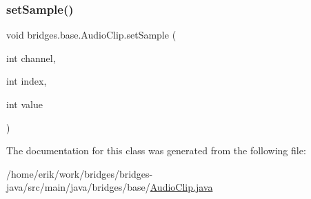 \mbox{\label{classbridges_1_1base_1_1_audio_clip_ae773ae030f39011060ae6088f19812f9}} 
\subsubsection{\texorpdfstring{set\+Sample()}{setSample()}}
{\footnotesize\ttfamily void bridges.\+base.\+Audio\+Clip.\+set\+Sample (\begin{DoxyParamCaption}\item[{int}]{channel,  }\item[{int}]{index,  }\item[{int}]{value }\end{DoxyParamCaption})}



The documentation for this class was generated from the following file\+:\begin{DoxyCompactItemize}
\item 
/home/erik/work/bridges/bridges-\/java/src/main/java/bridges/base/\hyperlink{_audio_clip_8java}{Audio\+Clip.\+java}\end{DoxyCompactItemize}
